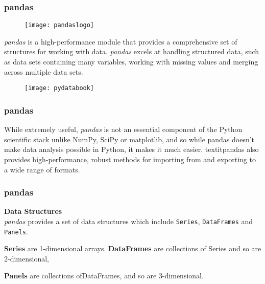 \documentclass[MASTER.tex]{subfiles}
\begin{document}
  
  \frametitle{pandas}
   
  \begin{figure}
   \centering
   \texttt{[image: pandaslogo]}
  \end{figure}
   
    \textit{pandas} is a high-performance module that provides a comprehensive set of structures for working with
   data. 
    \textit{pandas} excels at handling structured data, such as data sets containing many variables, working with
   missing values and merging across multiple data sets. 
   
  
 
\begin{figure}
\centering
\texttt{[image: pydatabook]}

\end{figure}


 

 
 \frametitle{pandas}
  


  
  While extremely useful, \textit{pandas} is not an essential
 component of the Python scientific stack unlike NumPy, SciPy or matplotlib, and so while pandas doesn’t
 make data analysis possible in Python, it makes it much easier.  textit{pandas} also provides high-performance,
 robust methods for importing from and exporting to a wide range of formats.
  
 
 
 \frametitle{pandas}
 
\noindent \textbf{Data Structures}\\

\textit{pandas} provides a set of data structures which include \texttt{Series}, \texttt{DataFrames} and \texttt{Panels}.
 
\item \textbf{Series} are 1-dimensional
 arrays.
  \textbf{DataFrames} are collections of Series and so are 2-dimensional, 
\item  \textbf{Panels} are collections ofDataFrames,
 and so are 3-dimensional.
  
 
\end{document}
